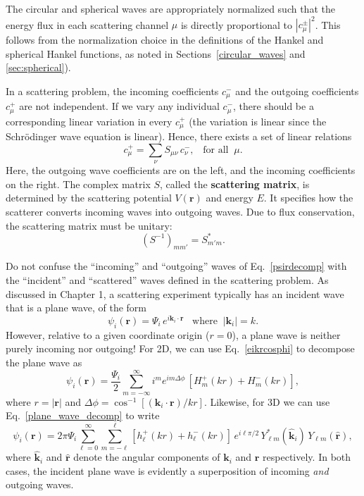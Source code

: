 \documentclass[prx,12pt]{revtex4-2}
\begin{document}
The circular and spherical waves are appropriately normalized such
that the energy flux in each scattering channel $\mu$ is directly
proportional to $|c_\mu^\pm|^2$.  This follows from the normalization
choice in the definitions of the Hankel and spherical Hankel
functions, as noted in Sections~\ref{circular_waves} and
\ref{sec:spherical}).

In a scattering problem, the incoming coefficients $c_\mu^-$ and the
outgoing coefficients $c_\mu^+$ are not independent.  If we vary any
individual $c_\mu^-$, there should be a corresponding linear variation
in every $c_\mu^+$ (the variation is linear since the Schr\"odinger
wave equation is linear).  Hence, there exists a set of linear
relations
\begin{equation}
  c_{\mu}^+ = \sum_{\nu} S_{\mu \nu} \, c_{\nu}^-, \;\;\;\text{for all}\;\;\mu.
  \label{srelation}
\end{equation}
Here, the outgoing wave coefficients are on the left, and the incoming
coefficients on the right.  The complex matrix $S$, called the
\textbf{scattering matrix}, is determined by the scattering potential
$V(\mathbf{r})$ and energy $E$.  It specifies how the scatterer
converts incoming waves into outgoing waves.  Due to flux
conservation, the scattering matrix must be unitary:
\begin{equation}
  \left(S^{-1}\right)_{mm'} = S_{m'm}^*.
  \label{Sunitary}
\end{equation}

Do not confuse the ``incoming'' and ``outgoing'' waves of
Eq.~\eqref{psirdecomp} with the ``incident'' and ``scattered'' waves
defined in the scattering problem.  As discussed in Chapter 1, a
scattering experiment typically has an incident wave that is a plane
wave, of the form
\begin{equation}
  \psi_i(\mathbf{r}) = \Psi_i \, e^{i\mathbf{k}_i\cdot\mathbf{r}} \;\;\;
  \mathrm{where}\;\; |\mathbf{k}_i| = k.
\end{equation}
However, relative to a given coordinate origin ($r = 0$), a plane wave
is neither purely incoming nor outgoing!  For 2D, we can use
Eq.~\eqref{eikrcosphi} to decompose the plane wave as
\begin{equation}
  \psi_i(\mathbf{r})
  = \frac{\Psi_i}{2} \sum_{m=-\infty}^\infty i^m e^{im \Delta\phi} \,
  \left[H_m^+(kr) + H_m^-(kr)\right],
  \label{psii_2d}
\end{equation}
where $r = |\mathbf{r}|$ and $\Delta \phi =
\cos^{-1}\left[(\mathbf{k}_i\!\cdot\!\mathbf{r})/kr\right]$.
Likewise, for 3D we can use Eq.~\eqref{plane_wave_decomp} to write
\begin{equation}
  \psi_i(\mathbf{r})
  = 2\pi \Psi_i \sum_{\ell=0}^\infty \sum_{m=-\ell}^\ell
  \left[h_{\ell}^+(kr) + h_{\ell}^-(kr) \right] \, e^{i\ell\pi/2} \,
  Y_{\ell m}^*(\hat{\mathbf{k}}_i) \, Y_{\ell m}(\hat{\mathbf{r}}),
  \label{psii_3d}
\end{equation}
where $\hat{\mathbf{k}}_i$ and $\hat{\mathbf{r}}$ denote the angular
components of $\mathbf{k}_i$ and $\mathbf{r}$ respectively.  In both
cases, the incident plane wave is evidently a superposition of
incoming \textit{and} outgoing waves.
\end{document}
